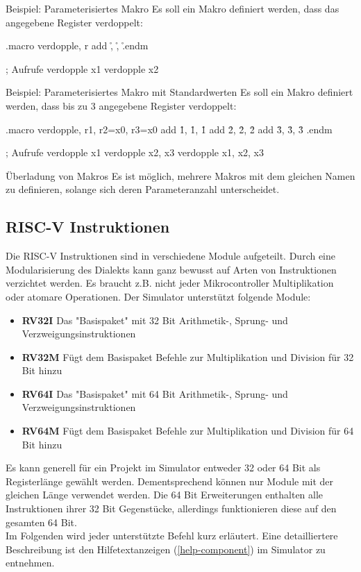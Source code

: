 \begin{exampleblock}{Beispiel: Parameterisiertes Makro}
	Es soll ein Makro definiert werden, dass das angegebene Register verdoppelt:
	\begin{riscv}
		.macro verdopple, r
		add \r, \r, \r
		.endm

		; Aufrufe
		verdopple x1
		verdopple x2
	\end{riscv}
\end{exampleblock}

\begin{exampleblock}{Beispiel: Parameterisiertes Makro mit Standardwerten}
	Es soll ein Makro definiert werden, dass bis zu 3 angegebene Register
	verdoppelt:
	\begin{riscv}
		.macro verdopple, r1, r2=x0, r3=x0
		add \r1, \r1, \r1
		add \r2, \r2, \r2
		add \r3, \r3, \r3
		.endm

		; Aufrufe
		verdopple x1
		verdopple x2, x3
		verdopple x1, x2, x3
	\end{riscv}
\end{exampleblock}

\begin{infoblock}{Überladung von Makros}
	Es ist möglich, mehrere Makros mit dem gleichen Namen zu definieren, solange
	sich deren Parameteranzahl unterscheidet.
\end{infoblock}

\subsection{RISC-V Instruktionen}

Die RISC-V Instruktionen sind in verschiedene Module aufgeteilt. Durch eine
Modularisierung des Dialekts kann ganz bewusst auf Arten von Instruktionen
verzichtet werden. Es braucht z.B. nicht jeder Mikrocontroller Multiplikation
oder atomare Operationen. Der Simulator unterstützt folgende Module:

\begin{itemize}
	\item \textbf{RV32I} Das "Basispaket" mit 32 Bit Arithmetik-, Sprung- und Verzweigungsinstruktionen
	\item\textbf{ RV32M} Fügt dem Basispaket Befehle zur Multiplikation und Division für 32 Bit hinzu
	\item \textbf{RV64I} Das "Basispaket" mit 64 Bit Arithmetik-, Sprung- und Verzweigungsinstruktionen
	\item \textbf{RV64M} Fügt dem Basispaket Befehle zur Multiplikation und Division für 64 Bit hinzu
\end{itemize}
Es kann generell für ein Projekt im Simulator entweder 32 oder 64 Bit als Registerlänge gewählt werden. Dementsprechend können nur Module mit der gleichen Länge verwendet werden. Die 64 Bit Erweiterungen enthalten alle Instruktionen ihrer 32 Bit Gegenstücke, allerdings funktionieren diese auf den gesamten 64 Bit.\\
Im Folgenden wird jeder unterstützte Befehl kurz erläutert. Eine detailliertere Beschreibung ist den Hilfetextanzeigen (\autoref{help-component}) im Simulator zu entnehmen.\\

